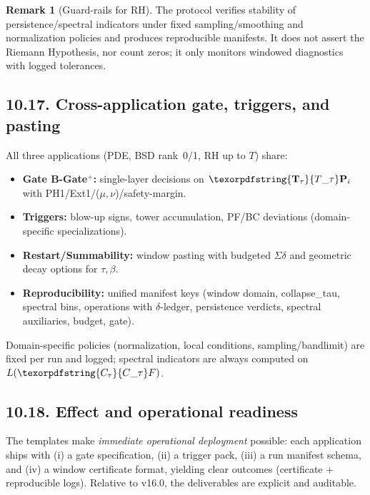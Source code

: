 \documentclass[11pt]{article}
\numberwithin{equation}{section}
\theoremstyle{plain}
\theoremstyle{definition}
\theoremstyle{remark}
\DeclareRobustCommand{\hyp}{\nobreakdash-}
\theoremstyle{plain}
\theoremstyle{definition}
\numberwithin{equation}{section}
\theoremstyle{definition}
\newtheorem{remark}[theorem]{Remark}
\DeclareRobustCommand{\Ttau}{\texorpdfstring{\ensuremath{\mathbf{T}_{\tau}}}{T\_\tau}}
\DeclareRobustCommand{\Ctau}{\texorpdfstring{\ensuremath{C_{\tau}}}{C\_\tau}}
\numberwithin{equation}{section}
\theoremstyle{plain}
\theoremstyle{definition}
\theoremstyle{remark}
\providecommand{\Cfun}[1]{\mathsf{C}_{#1}}
\providecommand{\Tfun}[1]{\mathbf{T}_{#1}}
\providecommand{\Ctau}{\Cfun{\tau}}
\providecommand{\Ttau}{\Tfun{\tau}}
\begin{document}
\begin{remark}[Guard\hyp rails for RH]
The protocol verifies stability of persistence/spectral indicators under fixed sampling/smoothing and normalization policies and produces reproducible manifests.
It does not assert the Riemann Hypothesis, nor count zeros; it only monitors windowed diagnostics with logged tolerances.
\end{remark}


\subsection*{10.17. Cross\hyp application gate, triggers, and pasting}
All three applications (PDE, BSD rank~0/1, RH up to \(T\)) share:
\begin{itemize}
  \item \textbf{Gate B\hyp Gate\(^{+}\):} single\hyp layer decisions on \(\Ttau\mathbf{P}_i\) with PH1/Ext1/(\(\mu,\nu\))/safety\hyp margin.
  \item \textbf{Triggers:} blow\hyp up signs, tower accumulation, PF/BC deviations (domain\hyp specific specializations).
  \item \textbf{Restart/Summability:} window pasting with budgeted \(\Sigma\delta\) and geometric decay options for \(\tau,\beta\).
  \item \textbf{Reproducibility:} unified manifest keys (window domain, collapse\_tau, spectral bins, operations with \(\delta\)\hyp ledger, persistence verdicts, spectral auxiliaries, budget, gate).
\end{itemize}
Domain\hyp specific policies (normalization, local conditions, sampling/bandlimit) are fixed per run and logged; spectral indicators are always computed on \(L(\Ctau F)\).

\subsection*{10.18. Effect and operational readiness}
The templates make \emph{immediate operational deployment} possible: each application ships with (i) a gate specification, (ii) a trigger pack, (iii) a run manifest schema, and (iv) a window certificate format, yielding clear outcomes (certificate + reproducible logs).
Relative to v16.0, the deliverables are explicit and auditable.
\end{document}
